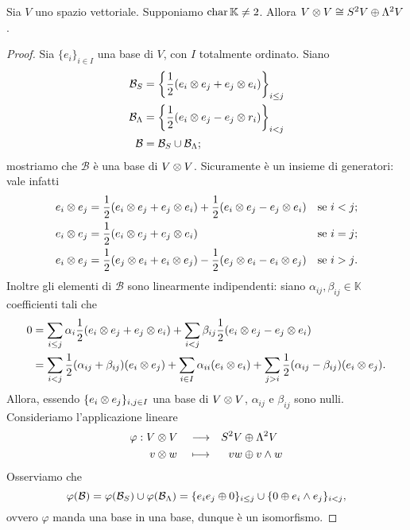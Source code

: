 \begin{proposition}
Sia $V$ uno spazio vettoriale. Supponiamo $\operatorname{char}\mathbb{K}\neq 2$. Allora $V\otimes V\cong S^2 V\oplus\Lambda^2 V$.
\end{proposition}
\begin{proof}
Sia $\{e_i\}_{i\in I}$ una base di $V$, con $I$ totalmente ordinato. Siano
\begin{align*}
\mathcal{B}_S&=\left\{\frac{1}{2}(e_i\otimes e_j+e_j\otimes e_i)\right\}_{i\le j}\\
\mathcal{B}_\Lambda&=\left\{\frac{1}{2}(e_i\otimes e_j-e_j\otimes r_i)\right\}_{i<j}\\
\mathcal{B}&=\mathcal{B}_S\cup\mathcal{B}_\Lambda;
\end{align*}
mostriamo che $\mathcal{B}$ è una base di $V\otimes V$. Sicuramente è un insieme di generatori: vale infatti
\begin{align*}
e_i\otimes e_j&=\frac{1}{2}(e_i\otimes e_j+e_j\otimes e_i)+\frac{1}{2}(e_i\otimes e_j-e_j\otimes e_i)&\text{se $i<j$};\\
e_i\otimes e_j&=\frac{1}{2}(e_i\otimes e_j+e_j\otimes e_i)&\text{se $i=j$};\\
e_i\otimes e_j&=\frac{1}{2}(e_j\otimes e_i+e_i\otimes e_j)-\frac{1}{2}(e_j\otimes e_i-e_i\otimes e_j)&\text{se $i>j$}.
\end{align*}
Inoltre gli elementi di $\mathcal{B}$ sono linearmente indipendenti: siano $\alpha_{ij},\beta_{ij}\in\mathbb{K}$ coefficienti tali che
\begin{align*}
0&=\sum_{i\le j}\alpha_i\frac{1}{2}(e_i\otimes e_j+e_j\otimes e_i)+\sum_{i<j}\beta_{ij}\frac{1}{2}(e_i\otimes e_j-e_j\otimes e_i)\\
&=\sum_{i<j}\frac{1}{2}(\alpha_{ij}+\beta_{ij})(e_i\otimes e_j)+\sum_{i\in I}\alpha_{ii}(e_i\otimes e_i)+\sum_{j>i}\frac{1}{2}(\alpha_{ij}-\beta_{ij})(e_i\otimes e_j).
\end{align*}
Allora, essendo $\{e_i\otimes e_j\}_{i,j\in I}$ una base di $V\otimes V$, $\alpha_{ij}$ e $\beta_{ij}$ sono nulli.\\
Consideriamo l'applicazione lineare
\begin{alignat*}{3}
\varphi:V&\otimes V&&\longrightarrow&S^2V&\oplus\Lambda^2V\\
v&\otimes w&&\longmapsto& vw&\oplus v\wedge w
\end{alignat*}
Osserviamo che
$$
\varphi(\mathcal{B})=\varphi(\mathcal{B}_S)\cup\varphi(\mathcal{B}_\Lambda)=\{e_ie_j\oplus0\}_{i\le j}\cup\{0\oplus e_i\wedge e_j\}_{i<j},
$$
ovvero $\varphi$ manda una base in una base, dunque è un isomorfismo.
\end{proof}
